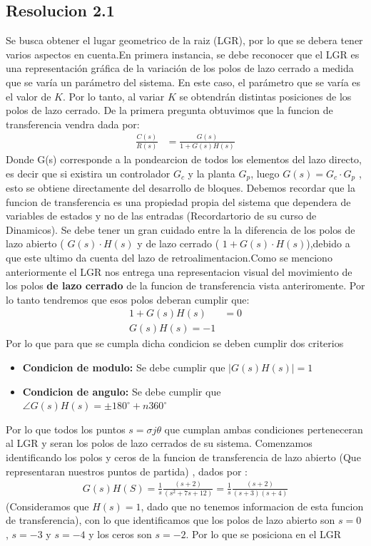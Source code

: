 \documentclass[
  11pt,
  letterpaper,
   addpoints,
   answers
  ]{exam}
\begin{document}
\begin{questions}
\begin{solution}
\subsection*{Resolucion 2.1}
    Se busca obtener el lugar geometrico de la raiz (LGR), por lo que se debera tener varios aspectos en cuenta.En primera instancia, se debe reconocer que el LGR es una representación gráfica de la variación de los polos de lazo cerrado a medida que se varía un parámetro del sistema. En este caso, el parámetro que se varía es el valor de $K$. Por lo tanto, al variar $K$ se obtendrán distintas posiciones de los polos de lazo cerrado. De la primera pregunta obtuvimos que la funcion de transferencia vendra dada por:
    \begin{align}
        \frac{C(s)}{R(s) }&= \frac{G(s)}{1+G(s)H(s)}
    \end{align} 
    Donde G(s) corresponde a la pondearcion de todos los elementos del lazo directo, es decir que si existira un controlador $G_{c}$ y la planta $G_{p}$, luego $G(s) = G_{c} \cdot G_{p}$ , esto se obtiene directamente del desarrollo de bloques. Debemos recordar que la funcion de transferencia es una propiedad propia del sistema que dependera de variables de estados y no de las entradas (Recordartorio de su curso de Dinamicos). Se debe tener un gran cuidado entre la la diferencia de los polos de lazo abierto ( $G(s) \cdot H(s)$ y de lazo cerrado ( $1+G(s) \cdot H(s)$),debido a que este ultimo da cuenta del lazo de retroalimentacion.Como se menciono anteriormente el LGR nos entrega una representacion visual del movimiento de los polos \textbf{de lazo cerrado} de la funcion de transferencia vista anteriromente. Por lo tanto tendremos que esos polos deberan cumplir que:
    \begin{align}
        1+G(s)H(s) &= 0\\
        G(s)H(s) = -1
    \end{align}
    Por lo que para que se cumpla dicha condicion se deben cumplir dos criterios
    \begin{itemize}
        \item \textbf{Condicion de modulo:} Se debe cumplir que $|G(s)H(s)| = 1$ 
        \item \textbf{Condicion de angulo:} Se debe cumplir que $\angle G(s)H(s) = \pm 180^{\circ} + n360^{\circ}$ 
    \end{itemize}
Por lo que todos los puntos $s = \sigma j\theta$ que cumplan ambas condiciones perteneceran al LGR y seran los polos de lazo cerrados de su sistema. Comenzamos identificando los polos y ceros de la funcion de transferencia de lazo abierto (Que representaran nuestros puntos de partida) , dados por :
\begin{align}
    G(s)H(S)= \frac{1}{s} \frac{(s+2)}{(s^{2} +7s +12)} = \frac{1}{s} \frac{(s+2)}{(s+3)(s+4)}
\end{align}
(Consideramos que $H(s)=1$, dado que no tenemos informacion de esta funcion de transferencia), con lo que identificamos que los polos de lazo abierto son $s=0$ , $s=-3$ y $s=-4$ y los ceros son $s=-2$. Por lo que se posiciona en el LGR


\end{solution}
\end{questions}
\end{document}

